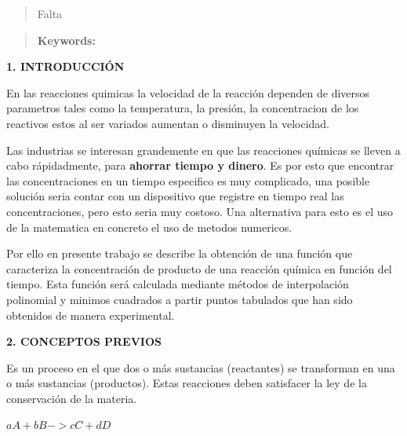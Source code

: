 \documentclass[10pt,a4paper]{article}
\begin{document}
	\begin{abstract}
		\noindent Falta
	\end{abstract}
	
	
	\begin{quotation}
		{\small
			\textbf{Keywords:} \\ 
		}
	\end{quotation}
	
	
	\pagebreak
	
	\begin{multicols}{2}
		
		\begin{center}
			{\large \bf 1. INTRODUCCIÓN}
		\end{center}
		
		En las reacciones quimicas la velocidad de la reacción dependen de diversos parametros tales como la temperatura, la presión, la concentracion de los reactivos estos al ser variados aumentan o disminuyen la velocidad.
		
		\noindent Las industrias se interesan grandemente en que las reacciones químicas se lleven a cabo rápidadmente, para \textbf{ahorrar tiempo y dinero}. Es por esto que  encontrar las concentraciones en un tiempo especifico es muy complicado, una posible solución seria contar con un dispositivo que registre en tiempo real las concentraciones, pero esto seria muy costoso. Una alternativa para esto es
		el uso de la matematica en concreto el uso de metodos numericos.
		
		\noindent Por ello en presente trabajo se describe la obtención de una función que caracteriza la concentración de producto de una reacción química en función del tiempo. Esta función será calculada mediante métodos de interpolación polinomial y minimos cuadrados a partir puntos tabulados que han sido obtenidos de manera experimental.\\
		
		
		\begin{center}
			{\large \bf 2. CONCEPTOS PREVIOS}
		\end{center}
		
		
		\noindent Es un proceso en el que dos o más sustancias (reactantes) se transforman en una o más sustancias (productos). Estas reacciones deben satisfacer la ley de la conservación de la materia.
		
		\begin{center}
			$aA  +  bB  ->  cC  +  dD$
		\end{center}
		

\end{multicols}
\end{document}
